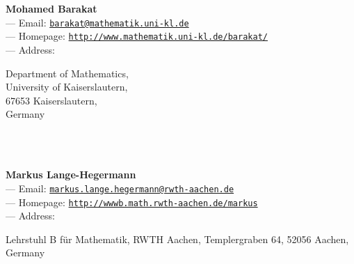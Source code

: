 \documentclass[a4paper,11pt]{report}
\begin{document}
\begin{titlepage}
\mbox{}\\
{\mbox{}\\
\small \noindent \textbf{Mohamed Barakat\\
    } --- Email: \href{mailto://barakat@mathematik.uni-kl.de} {\texttt{barakat@mathematik.uni-kl.de}}\\
 --- Homepage: \href{http://www.mathematik.uni-kl.de/~barakat/} {\texttt{http://www.mathematik.uni-kl.de/\texttt{}barakat/}}\\
 --- Address: \begin{minipage}[t]{8cm}\noindent
 Department of Mathematics, \\
 University of Kaiserslautern, \\
 67653 Kaiserslautern, \\
 Germany \end{minipage}
}\\
{\mbox{}\\
\small \noindent \textbf{Markus Lange-Hegermann\\
    } --- Email: \href{mailto://markus.lange.hegermann@rwth-aachen.de} {\texttt{markus.lange.hegermann@rwth-aachen.de}}\\
 --- Homepage: \href{http://wwwb.math.rwth-aachen.de/~markus} {\texttt{http://wwwb.math.rwth-aachen.de/\texttt{}markus}}\\
 --- Address: \begin{minipage}[t]{8cm}\noindent
 Lehrstuhl B f{\"u}r Mathematik, RWTH Aachen, Templergraben 64, 52056 Aachen,
Germany \end{minipage}
}\\
\end{titlepage}
\end{document}

